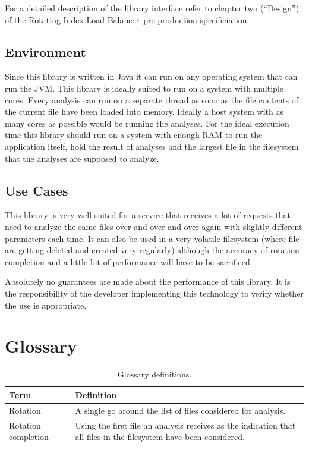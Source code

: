 \documentclass[11pt]{article} %
\newcommand{\rilb}{Rotating Index Load Balancer}
\begin{document}
  For a detailed description of the library interface refer to chapter two (``Design'') of the \rilb\ pre-production specificiation\hyperref[fn:pp-spec]{\footnotemark[1]}.


  \subsection{Environment}\label{sec:3.1}

  Since this library is written in Java it can run on any operating system that can run the JVM. This library is ideally suited to run on a system with multiple cores. Every analysis can run on a separate thread as soon as the file contents of the current file have been loaded into memory. Ideally a host system with as many cores as possible would be running the analyses. For the ideal execution time this library should run on a system with enough RAM to run the application itself, hold the result of analyses and the largest file in the filesystem that the analyses are supposed to analyze.


  \subsection{Use Cases}\label{sec:3.2}

  This library is very well suited for a service that receives a lot of requests that need to analyze the same files over and over and over again with slightly different parameters each time. It can also be used in a very volatile filesystem (where file are getting deleted and created very regularly) although the accuracy of rotation completion and a little bit of performance will have to be sacrificed.

  Absolutely no guarantees are made about the performance of this library. It is the responsibility of the developer implementing this technology to verify whether the use is appropriate.



  \newpage



  \section{Glossary}

  \begin{table}[H]
    \centering
    \begin{tabular}{p{.3\linewidth} | p{.6\linewidth}}
      \textbf{Term} & \textbf{Definition}
      \\\hline
      Rotation            & A single go around the list of files considered for analysis.                                                      \\\hline
      Rotation completion & Using the first file an analysis receives as the indication that all files in the filesystem have been considered.
    \end{tabular}
    \caption{Glossary definitions.}
    \label{tab:glossary}
  \end{table}

  \printbibliography[heading=bibintoc]
  \listoffigures
  \listoftables
\end{document}
